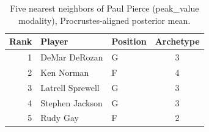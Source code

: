\begin{table}[htbp]
  \centering\small
  \begin{tabular}{rllc}
    \toprule
    Rank & Player & Position & Archetype \\
    \midrule
    1 & DeMar DeRozan & G & 3 \\
    2 & Ken Norman & F & 4 \\
    3 & Latrell Sprewell & G & 3 \\
    4 & Stephen Jackson & G & 3 \\
    5 & Rudy Gay & F & 2 \\
    \bottomrule
  \end{tabular}
  \caption{Five nearest neighbors of Paul Pierce (peak_value modality), Procrustes-aligned posterior mean.}
  \label{tab:Paul_Pierce_neighbors_peak_value}
\end{table}

